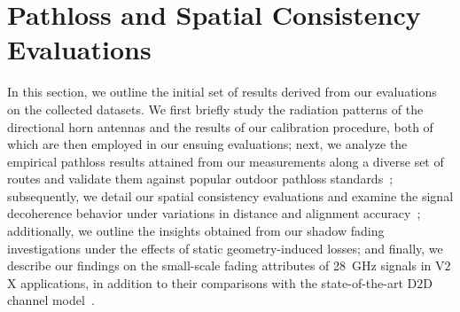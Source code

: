 \documentclass[10pt, twocolumn]{IEEEtran}
\begin{document}
{%
\section{Pathloss and Spatial Consistency Evaluations}\label{S4}
In this section, we outline the initial set of results derived from our evaluations on the collected datasets. We first briefly study the radiation patterns of the directional horn antennas and the results of our calibration procedure, both of which are then employed in our ensuing evaluations; next, we analyze the empirical pathloss results attained from our measurements along a diverse set of routes and validate them against popular outdoor pathloss standards~\cite{MacCartneyModelsOverview}; subsequently, we detail our spatial consistency evaluations and examine the signal decoherence behavior under variations in distance and alignment accuracy~\cite{SpatialConsistencyOriginal}; additionally, we outline the insights obtained from our shadow fading investigations under the effects of static geometry-induced losses; and finally, we describe our findings on the small-scale fading attributes of \SI{28}{\giga\hertz} signals in V$2$X applications, in addition to their comparisons with the state-of-the-art D$2$D channel model~\cite{D2DHumanBlockage}. 

}
\end{document}
